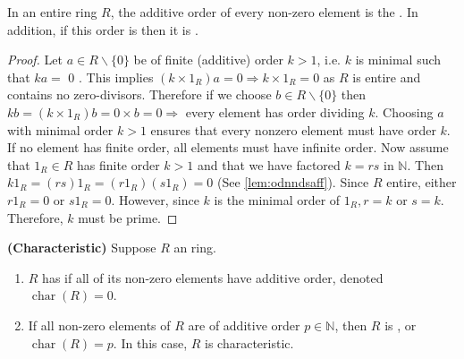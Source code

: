 \documentclass{article}
\newcommand{\bfs}[1]{\textbf{({#1}) }}
\newcommand{\charac}{\operatorname{char}}
\begin{document}
\begin{thma}\label{thm:daiocd}
 In an entire ring $R$, the additive order of every non-zero element is the . In addition, if this order is  then it is .
\end{thma}
\begin{proof}
 Let $a \in R \backslash\{0\}$ be of finite (additive) order $k>1$, i.e. $k$ is minimal such that $k a=$ 0 . This implies $\left(k \times 1_{R}\right) a=0 \Rightarrow k \times 1_{R}=0$ as $R$ is entire and contains no zero-divisors. Therefore if we choose $b \in R \backslash\{0\}$ then $k b=\left(k \times 1_{R}\right) b=0 \times b=0 \Rightarrow$ every element has order dividing $k$. Choosing $a$ with minimal order $k>1$ ensures that every nonzero element must have order $k$. If no element has finite order, all elements must have infinite order.
Now assume that $1_{R} \in R$ has finite order $k>1$ and that we have factored $k=r s$ in $\mathbb{N}$. Then $k 1_{R}=(r s) 1_{R}=\left(r 1_{R}\right)\left(s 1_{R}\right)=0$ (See \cref{lem:odnndsaff}). Since $R$ entire, either $r 1_{R}=0$ or $s 1_{R}=0$. However, since $k$ is the minimal order of $1_{R}, r=k$ or $s=k$. Therefore, $k$ must be prime.
\end{proof}


\begin{defa}\bfs{Characteristic}
Suppose $R$ an  ring.
\begin{enumerate}
    \item $R$ has  if all of its non-zero elements have  additive order, denoted $\charac(R)=0$.
    \item If all non-zero elements of $R$ are of additive order $p \in \mathbb{N}$, then $R$ is , or  $\charac(R)=p$. In this case, $R$ is  characteristic.
\end{enumerate} 
\end{defa}
\end{document}
